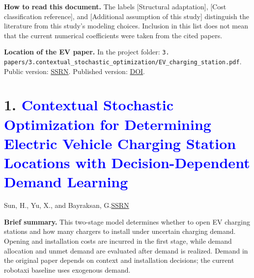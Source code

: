 \documentclass[10pt,a4paper]{article}
\newcommand{\evtitle}{Contextual Stochastic Optimization for Determining Electric Vehicle Charging Station Locations with Decision-Dependent Demand Learning}
\begin{document}
\textbf{How to read this document.} The labels [Structural adaptation], [Cost classification reference], and [Additional assumption of this study] distinguish the literature from this study's modeling choices. Inclusion in this list does not mean that the current numerical coefficients were taken from the cited papers.

\textbf{Location of the EV paper.} In the project folder: \texttt{3. papers/3.contextual\_stochastic\_optimization/EV\_charging\_station.pdf}. Public version: \href{https://papers.ssrn.com/sol3/papers.cfm?abstract_id=5078715}{SSRN}. Published version: \href{https://doi.org/10.1016/j.trb.2026.103524}{DOI}.

\newpage
\hypertarget{paper:ev}{}
\section*{1. \textcolor{blue}{\evtitle}}
{\color{blue}Sun, H., Yu, X., and Bayraksan, G.\quad \href{https://papers.ssrn.com/sol3/papers.cfm?abstract_id=5078715}{SSRN}}

\textbf{Brief summary.} This two-stage model determines whether to open EV charging stations and how many chargers to install under uncertain charging demand. Opening and installation costs are incurred in the first stage, while demand allocation and unmet demand are evaluated after demand is realized. Demand in the original paper depends on context and installation decisions; the current robotaxi baseline uses exogenous demand.
\end{document}
